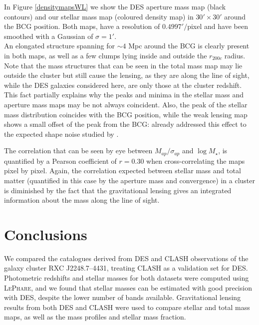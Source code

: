 {In Figure \ref{densitymapsWL} we show the DES aperture mass map (black contours) and our stellar mass map (coloured density map) in $30'\times 30'$ around the BCG position. Both maps, have a resolution of $0.4997'/$pixel and have been smoothed with a Gaussian of $\sigma = 1'$.\\

An elongated structure spanning for $\sim 4$ Mpc around the BCG is clearly present in both maps, as well as a few clumps lying inside and outside the $r_{200c}$ radius. Note that the mass structures that can be seen in the total mass map may lie outside the cluster but still cause the lensing, as they are along the line of sight, while the DES galaxies considered here, are only those at the cluster redshift. This fact partially explains why the peaks and minima in the stellar mass and aperture mass maps may be not always coincident.  Also, the peak of the stellar mass distribution coincides with the BCG position, while the weak lensing map shows a small offset of the peak from the BCG: \citet{gruen} already addressed this effect to the expected shape noise studied by \citet{dietrich}.

The correlation that can be seen by eye between $M_{ap}/\sigma_{ap}$ and $\log{M_\star}$, is quantified by a Pearson coefficient of $r=0.30$  when cross-correlating the maps pixel by pixel. Again, the correlation expected between stellar mass and total matter (quantified in this case by the aperture mass and convergence) in a cluster is diminished by the fact that the gravitational lensing gives an integrated information about the mass along the line of sight. 

\section{Conclusions}
We compared the catalogues derived from DES and CLASH observations of the galaxy cluster RXC J2248.7--4431, treating CLASH as a validation set for DES. Photometric redshifts and stellar masses for both datasets were computed using \textsc{LePhare}, and we found that stellar masses can be estimated with good precision with DES, despite the lower number of bands available. Gravitational lensing results from both DES and CLASH were used to compare stellar and total mass maps, as well as the mass profiles and stellar mass fraction. 

}
